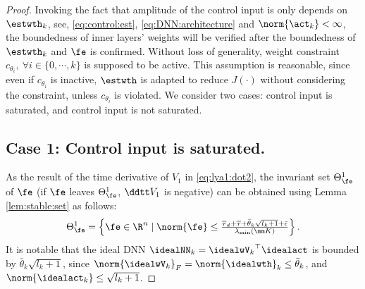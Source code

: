 \documentclass[lettersize,journal]{IEEEtran}
\begin{document}
\begin{proof}

Invoking the fact that amplitude of the control input is only depends on $\estwth_k$, \ie see, \eqref{eq:control:est}, \eqref{eq:DNN:architecture} and $\norm{\act_k}<\infty$, the boundedness of inner layers' weights will be verified after the boundedness of $\estwth_k$ and $\fe$ is confirmed. 
Without loss of generality, weight constraint $c_{\theta_i},\ \forall i\in\{0,\cdots,k\}$ is supposed to be active.
This assumption is reasonable, since even if $c_{\theta_i}$ is inactive, $\estwth$ is adapted to reduce $J(·)$ without considering the constraint, unless $c_{\theta_i}$ is
violated.
We consider two cases: control input is saturated, and control input is not saturated.

\subsection*{Case 1: Control input is saturated.}

As the result of the time derivative of $V_1$ in \eqref{eq:lya1:dot2}, the invariant set $\Theta_{\fe}^{1}$ of $\fe$ (\ie if $\fe$ leaves $\Theta_{\fe}^{1}$, $\ddtt V_1$ is negative) can be obtained using Lemma \ref{lem:stable:set} as follows:
\begin{equation}
    \Theta_{\fe}^{1} 
    = 
    \left\{ 
        \fe \in \R^n 
        \mid 
        \norm{\fe} 
        \le 
        \tfrac{
            \overline\tau_d
            +
            \overline\tau
            +
            \bar{\theta}_k\sqrt{l_{k}+1}
            +
            \bar{\epsilon}
        }{
            \lambda_{\min}(\mm K)
        }
    \right\}
    .
    \label{eq:invariant:c1:fe}
\end{equation}
It is notable that the ideal DNN $\idealNN_k={\idealwV_k}^\top\idealact$ is bounded by $\bar{\theta}_k\sqrt{l_{k}+1}$, since $\norm{\idealwV_k}_F = \norm{\idealwth}_k \le \bar{\theta}_k$, and $\norm{\idealact_k}\le \sqrt{l_{k}+1}$.


\end{proof}
\end{document}
